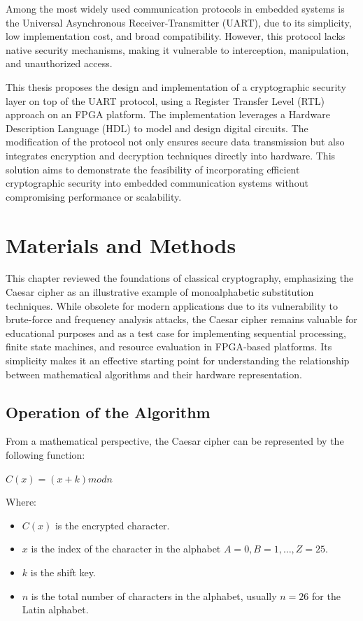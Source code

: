 \documentclass[journal,article,submit,pdftex,moreauthors]{Definitions/mdpi}
\begin{document}
Among the most widely used communication protocols in embedded systems is the Universal Asynchronous Receiver-Transmitter (UART), due to its simplicity, low implementation cost, and broad compatibility. However, this protocol lacks native security mechanisms, making it vulnerable to interception, manipulation, and unauthorized access.

This thesis proposes the design and implementation of a cryptographic security layer on top of the UART protocol, using a Register Transfer Level (RTL) approach on an FPGA platform. The implementation leverages a Hardware Description Language (HDL) to model and design digital circuits. The modification of the protocol not only ensures secure data transmission but also integrates encryption and decryption techniques directly into hardware. This solution aims to demonstrate the feasibility of incorporating efficient cryptographic security into embedded communication systems without compromising performance or scalability. 

\section{Materials and Methods}

This chapter reviewed the foundations of classical cryptography, emphasizing the Caesar cipher as an illustrative example of monoalphabetic substitution techniques. While obsolete for modern applications due to its vulnerability to brute-force and frequency analysis attacks, the Caesar cipher remains valuable for educational purposes and as a test case for implementing sequential processing, finite state machines, and resource evaluation in FPGA-based platforms. Its simplicity makes it an effective starting point for understanding the relationship between mathematical algorithms and their hardware representation.

\subsection{Operation of the Algorithm}
From a mathematical perspective, the Caesar cipher can be represented by the following function:
\centerline{\(C(x) = ( x + k ) mod n \)}

Where:

\begin{itemize}
\item $C(x)$ is the encrypted character.
\item $x$ is the index of the character in the alphabet $A = 0, B = 1, \dots, Z = 25$.
\item $k$ is the shift key.
\item $n$ is the total number of characters in the alphabet, usually $n = 26$ for the Latin alphabet.
\end{itemize}
\end{document}
